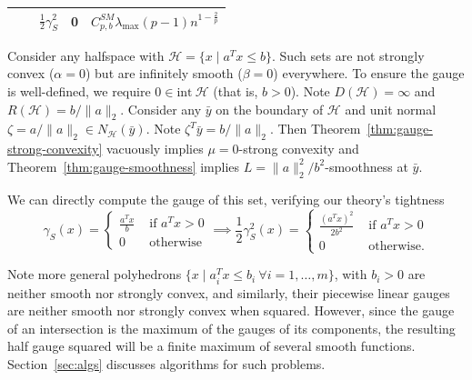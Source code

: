 \documentclass[sn-mathphys,Numbered]{sn-jnl}%
\begin{document}
\begin{table}[t]
\begin{tabular}{|cc|c|c|c|}
\multicolumn{1}{|c|}{} & \multicolumn{1}{c|}{} & $\frac{1}{2}\gamma^2_S$ &0 &$C^{SM}_{p,b}\lambda_{\max}(p-1)n^{1-\frac{2}{p}}$ \\ \hline
\end{tabular}
 \label{tab:set-examples}
\end{table}

 Consider any halfspace with $\mathcal{H}=\{x \mid a^Tx \leq b\}$. Such sets are not strongly convex ($\alpha=0$) but are infinitely smooth ($\beta=0$) everywhere. To ensure the gauge is well-defined, we require $0\in \mathrm{int\ }\mathcal{H}$ (that is, $b>0$). Note $D(\mathcal{H})=\infty$ and $R(\mathcal{H})=b/\|a\|_2$. Consider any $\bar y$ on the boundary of $\mathcal{H}$ and unit normal $\zeta = a/\|a\|_2\in N_{\mathcal{H}}(\bar y)$. Note $\zeta^T\bar y= b/\|a\|_2$. Then Theorem~\ref{thm:gauge-strong-convexity} vacuously implies $\mu=0$-strong convexity and Theorem~\ref{thm:gauge-smoothness} implies $L=\|a\|_2^2/b^2$-smoothness at $\bar y$.

We can directly compute the gauge of this set, verifying our theory's tightness
$$ \gamma_S(x) = \begin{cases} \frac{a^Tx}{b} & \text{ if } a^Tx > 0\\0 & \text{ otherwise}
\end{cases} \implies \frac{1}{2}\gamma_S^2(x) = \begin{cases} \frac{(a^Tx)^2}{2b^2} & \text{ if } a^Tx > 0\\0 & \text{ otherwise.}
\end{cases}
$$

Note more general polyhedrons $\{x \mid a_i^Tx \leq b_i\ \forall i=1,\dots,m\}$, with $b_i>0$ are neither smooth nor strongly convex, and similarly, their piecewise linear gauges are neither smooth nor strongly convex when squared. However, since the gauge of an intersection is the maximum of the gauges of its components, the resulting half gauge squared will be a finite maximum of several smooth functions. Section~\ref{sec:algs} discusses algorithms for such problems.
\end{document}
